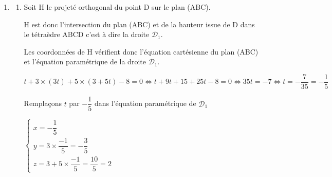 \begin{enumerate}
\begin{enumerate}
(S) $\Longleftrightarrow  \begin{cases} t =1+3s \\ 14s=-4\\ 21s=-6  \end{cases} \Longleftrightarrow  \begin{cases} t =1+3s = 1 + 3\times \dfrac{-2}{7}= \dfrac{1}{7} \\ s=-\dfrac{4}{14}=-\dfrac{2}{7}\\ s=-\dfrac{6}{21} =-\dfrac{2}{7} \end{cases} $

Le système admet une unique solution donc les droites $\mathcal{D}_{1}$ et $\mathcal{D}_{2}$   sont sécantes.


Remplaçons $t$ par $\dfrac{1}{7}$ dans l'équation paramétrique de $\mathcal{D}_{1}$

			  $\begin{cases} x= \dfrac{1}{7}\\ y=3 \times \dfrac{1}{7} = \dfrac{3}{7} \\ z=3+5 \times \dfrac{1}{7}  = \dfrac{26}{7} \end{cases} $

Les droites $\mathcal{D}_{1}$ et $\mathcal{D}_{2}$ sont donc sécantes et  les coordonnées de leur point d'intersection sont $\left( \dfrac{1}{7}~;~\dfrac{3}{7}~;~\dfrac{26}{7}\right)$.
\end{enumerate}
	\item
		\begin{enumerate}
		\item  Soit H le projeté orthogonal  du point D sur le plan (ABC).

H est donc l'intersection du plan (ABC) et de la hauteur issue de D dans le tétraèdre ABCD c'est à dire la droite $\mathcal{D}_{1}$.

Les coordonnées de H vérifient donc l'équation cartésienne du plan (ABC) et l'équation paramétrique de la droite  $\mathcal{D}_{1}$.

$t+3 \times (3t) +5 \times (3+5t) -8=0 \Longleftrightarrow t+9t+15+25t-8=0 \Longleftrightarrow 35t = -7 \Longleftrightarrow t= -\dfrac{7}{35} = -\dfrac{1}{5}$

Remplaçons $t$ par $-\dfrac{1}{5}$ dans l'équation paramétrique de $\mathcal{D}_{1}$

$\begin{cases} x=- \dfrac{1}{5}\\ y=3 \times \dfrac{-1}{5} = -\dfrac{3}{5} \\ z=3+5 \times \dfrac{-1}{5}  = \dfrac{10}{5}=2 \end{cases} $


\end{enumerate}
\end{enumerate}
